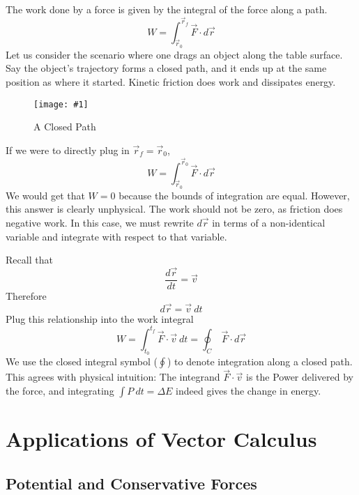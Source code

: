 \documentclass[11pt]{article}
\newcommand{\fig}[4]{
    \begin{figure}[H]
        \centering
        \texttt{[image: \#1]}
        \caption{#2}
        \label{exp4fit}
    \end{figure}
}
\theoremstyle{gangnamstyle}{\newtheorem{definition}{Definition}[]}
\theoremstyle{gangnamstyle}{\newtheorem{example}{Example}[]}
\theoremstyle{gangnamstyle}{\newtheorem{problem}{Problem}[]}
\begin{document}
The work done by a force is given by the integral of the force along a path. 
\[ W = \int_{\Vec{r}_0}^{\Vec{r}_f} \Vec{F} \cdot d\Vec{r} \]
Let us consider the scenario where one drags an object along the table surface. Say the object's trajectory forms a closed path, and it ends up at the same position as where it started. Kinetic friction does work and dissipates energy. 

\fig{figs/n0/path.png}{A Closed Path}{0.65}{0}

If we were to directly plug in ${\Vec{r}_f} = {\Vec{r}_0}$, 
\[ W = \int_{\Vec{r}_0}^{\Vec{r}_0} \Vec{F} \cdot d\Vec{r} \]
We would get that $W = 0$ because the bounds of integration are equal. However, this answer is clearly unphysical. The work should not be zero, as friction does negative work. In this case, we must rewrite $d\Vec{r}$ in terms of a non-identical variable and integrate with respect to that variable. 

Recall that
\[ \frac{d\Vec{r}}{dt} = \Vec{v} \]
Therefore
\[ d\Vec{r} = \Vec{v} \ dt \]
Plug this relationship into the work integral
\[ W = \int_{t_0}^{t_f} \Vec{F} \cdot \Vec{v} \ dt = \oint_C \ \Vec{F} \cdot d\Vec{r} \]
We use the closed integral symbol ($\oint$) to denote integration along a closed path. This agrees with physical intuition: The integrand $\Vec{F} \cdot \Vec{v}$ is the Power delivered by the force, and integrating $\int P \ dt = \Delta E$ indeed gives the change in energy. 

\section{Applications of Vector Calculus}
\subsection{Potential and Conservative Forces}
\end{document}
